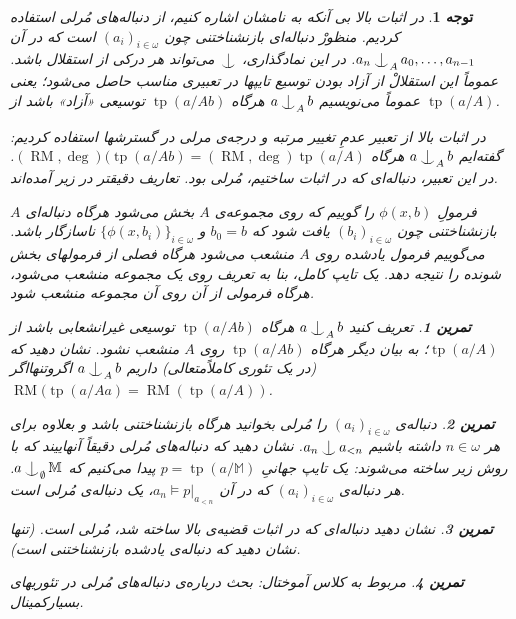 \documentclass[12pt,a4paper]{report}
\def\Ind#1#2{#1\setbox0=\hbox{$#1x$}\kern\wd0\hbox to 0pt{\hss$#1\mid$\hss}
\lower.9\ht0\hbox to 0pt{\hss$#1\smile$\hss}\kern\wd0}
\def\ind{\mathop{\mathpalette\Ind{}}}
\theoremstyle{colorhead}
\newtheorem{tam}{تمرین}
\newtheorem{tav}[thm]{توجه}
\DeclareMathOperator{\RM}{RM}
\DeclareMathOperator{\tp}{tp}
\begin{document}
\begin{framed}
\begin{tav}
در اثبات بالا بی آنکه به نامشان اشاره کنیم، از دنباله‌های مُرلی
استفاده کردیم. منظورْ‌
دنباله‌ای 
بازنشناختنی
چون
$(a_i)_{i\in \omega}$
است که در آن
$a_n\ind_A a_0,\ldots,a_{n-1}$.
در این نمادگذاری،
$\ind$
می‌تواند هر درکی از استقلال باشد. عموماً‌ این استقلالْ از آزاد بودن توسیع تایپها در تعبیری مناسب
حاصل می‌شود؛ یعنی عموماً می‌نویسیم
$a\ind_A b$
هرگاه
$\tp(a/Ab)$
توسیعی «آزاد» باشد از 
$\tp(a/A)$.
\par 
در اثبات بالا از تعبیر عدمِ تغییر مرتبه‌ و درجه‌ی مرلی در گسترشها استفاده کردیم: گفته‌ایم
$a\ind_A b$
هرگاه
$(\RM,\deg)(\tp(a/Ab)=(\RM,\deg)\tp(a/A)$.
در این تعبیر، دنباله‌ای که در اثبات ساختیم، مُرلی بود. تعاریف دقیقتر در زیر آمده‌اند.
\par 
فرمولِ
$\phi(x,b)$
را گوییم که روی مجموعه‌ی
$A$
بخش می‌شود هرگاه
دنباله‌ای $A$بازنشناختنی چون
$(b_i)_{i\in \omega}$
یافت شود که 
$b_0=b$
و
$\{\phi(x,b_i)\}_{i\in \omega}$
ناسازگار باشد. می‌گوییم فرمول یادشده روی
$A$
منشعب می‌شود هرگاه فصلی از فرمولهای بخش شونده را نتیجه دهد. یک تایپ کامل، بنا به تعریف روی 
یک مجموعه منشعب می‌شود، هرگاه 
فرمولی از آن روی آن مجموعه منشعب شود. 
\begin{tam}
تعریف کنید
$a\ind_A b$
هرگاه
$\tp(a/Ab)$
توسیعی غیرانشعابی باشد از
$\tp(a/A)$؛
به بیان دیگر هرگاه
$\tp(a/Ab)$
روی
$A$
منشعب نشود. 
نشان دهید که (در یک تئوری کاملاً‌متعالی) داریم
$a\ind_A b$
اگروتنهااگر
$\RM(\tp(a/Aa)=\RM(\tp(a/A))$.
\end{tam}
\begin{tam}
دنباله‌ی 
$(a_i)_{i\in \omega}$
را مُرلی بخوانید هرگاه
بازنشناختنی باشد و بعلاوه
برای هر
$n\in \omega$
داشته باشیم
$a_n\ind a_{<n}$.
نشان دهید که 
دنباله‌های مُرلی دقیقاً‌
آنهاییند که با روش زیر ساخته‌ می‌شوند: یک تایپ جهانیِ
$p=\tp(a/\mathbb{M})$
پیدا می‌کنیم که 
$a\ind_\emptyset \mathbb{M}$.
هر دنباله‌ی 
$(a_i)_{i\in \omega}$
که در آن
$a_n\models p|_{a_{<n}}$،
یک دنباله‌ی مُرلی است. 
\end{tam}
\begin{tam}
نشان دهید دنباله‌ای که در اثبات قضیه‌ی بالا ساخته شد،‌ مُرلی است.  (تنها نشان دهید که دنباله‌ی یادشده بازنشناختنی است).
\end{tam}
\begin{tam}
مربوط به کلاس آموختال: بحث درباره‌ی دنباله‌های مُرلی در تئوریهای بسیارکمینال.
\end{tam}
\end{tav}
\end{framed}
\pagebreak
\end{document}
